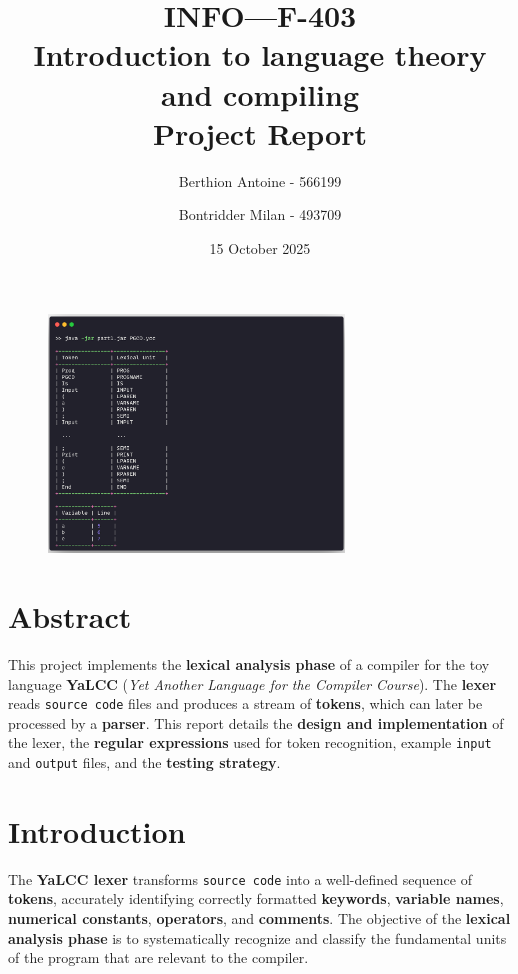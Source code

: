 \documentclass{article}
\title{\textbf{INFO—F-403} \\
Introduction to language theory and compiling \\ 
Project Report}
\author{Berthion Antoine - 566199 \and Bontridder Milan - 493709}
\date{15 October 2025}
\begin{document}
\maketitle

\vspace{-2em}

\begin{figure}[H]
    \centering
    \includegraphics[width=0.7\textwidth]{src/intro.png}
    \label{fig:intro}
\end{figure}

\vspace{-1em}

\section*{Abstract}

This project implements the \textbf{lexical analysis phase} of a compiler for the toy language \textbf{YaLCC} (\textit{Yet Another Language for the Compiler Course}). The \textbf{lexer} reads \texttt{source code} files and produces a stream of \textbf{tokens}, which can later be processed by a \textbf{parser}. This report details the \textbf{design and implementation} of the lexer, the \textbf{regular expressions} used for token recognition, example \texttt{input} and \texttt{output} files, and the \textbf{testing strategy}.


\section{Introduction}

\noindent The \textbf{YaLCC lexer} transforms \texttt{source code} into a well-defined sequence of \textbf{tokens}, accurately identifying correctly formatted \textbf{keywords}, \textbf{variable names}, \textbf{numerical constants}, \textbf{operators}, and \textbf{comments}. The objective of the \textbf{lexical analysis phase} is to systematically recognize and classify the fundamental units of the program that are relevant to the compiler. \\
\end{document}
